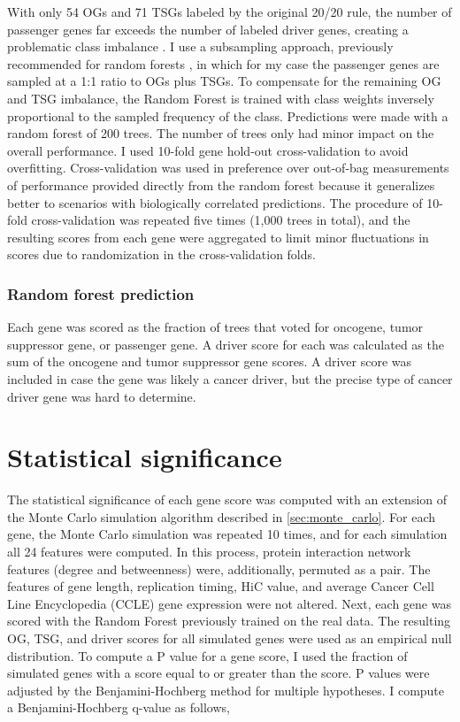 With only 54 OGs and 71 TSGs labeled by the original 20/20 rule, the number of passenger genes far exceeds the number of labeled driver genes, creating a problematic class imbalance \cite{RN93}. I use a subsampling approach, previously recommended for random forests \cite{RN92}, in which for my case the passenger genes are sampled at a 1:1 ratio to OGs plus TSGs. To compensate for the remaining OG and TSG imbalance, the Random Forest is trained with class weights inversely proportional to the sampled frequency of the class. Predictions were made with a random forest of 200 trees. The number of trees only had minor impact on the overall performance. I used 10-fold gene hold-out cross-validation to avoid overfitting. Cross-validation was used in preference over out-of-bag measurements of performance provided directly from the random forest because it generalizes better to scenarios with biologically correlated predictions. The procedure of 10-fold cross-validation was repeated five times (1,000 trees in total), and the resulting scores from each gene were aggregated to limit minor fluctuations in scores due to randomization in the cross-validation folds.

\subsubsection{Random forest prediction}

Each gene was scored as the fraction of trees that voted for oncogene, tumor suppressor gene, or passenger gene. A driver score for each was calculated as the sum of the oncogene and tumor suppressor gene scores. A driver score was included in case the gene was likely a cancer driver, but the precise type of cancer driver gene was hard to determine.

\section{Statistical significance}

The statistical significance of each gene score was computed with an extension of the Monte Carlo simulation algorithm described in \autoref{sec:monte_carlo}. For each gene, the Monte Carlo simulation was repeated 10 times, and for each simulation all 24 features were computed. In this process, protein interaction network features (degree and betweenness) were, additionally, permuted as a pair. The features of gene length, replication timing, HiC value, and average Cancer Cell Line Encyclopedia (CCLE) gene expression were not altered. Next, each  gene was scored with the Random Forest previously trained on the real data. The resulting OG, TSG, and driver scores for all simulated genes were used as an empirical null distribution. To compute a P value for a gene score, I used the fraction of simulated genes with a score equal to or greater than the score. P values were adjusted by the Benjamini-Hochberg method \cite{RN94} for multiple hypotheses. I compute a Benjamini-Hochberg q-value as follows,

